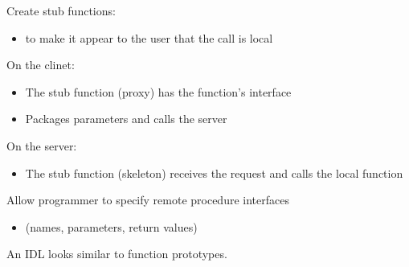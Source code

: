 \begin{slide}


    Create stub functions:
	\begin{itemize}
		\item to make it appear to the user that the call is local
	\end{itemize}
	\bigskip
	
	On the clinet:
	\begin{itemize}
		\item The stub function (proxy) has the function’s interface
		\item Packages parameters and calls the server
	\end{itemize}
	\bigskip
	
	On the server:
	\begin{itemize}
		\item The stub function (skeleton) receives the request and calls the local function
	\end{itemize}

\end{slide}

\begin{slide}

	
	Allow programmer to specify remote procedure interfaces
	\begin{itemize}
		\item (names, parameters, return values)
	\end{itemize}

	An IDL looks similar to function prototypes.
	
\end{slide}

\begin{slide}


    \inputminted{python}{Adder.idl}

\end{slide}

\begin{slide}


    \inputminted{python}{server.py}
    \bigskip

    \inputminted{python}{client.py}

\end{slide}

